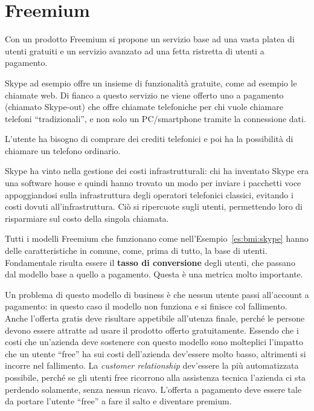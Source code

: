 \section{Freemium}

Con un prodotto Freemium si propone un servizio base ad una vasta platea di
utenti gratuiti e un servizio avanzato ad una fetta ristretta di utenti a
pagamento.

\begin{example}[Skype]\label{es:bmi:skype}
Skype ad esempio offre un insieme di funzionalità gratuite, come ad esempio le
chiamate web. Di fianco a questo servizio ne viene offerto uno a pagamento
(chiamato Skype-out) che offre chiamate telefoniche per chi vuole chiamare
telefoni ``tradizionali'', e non solo un PC/smartphone tramite la connessione
dati.

\noindent L'utente ha bisogno di comprare dei crediti telefonici e poi ha la
possibilità di chiamare un telefono ordinario.

\noindent Skype ha vinto nella gestione dei costi infrastrutturali:
chi ha inventato Skype era una software house e quindi hanno trovato un modo per inviare i pacchetti voce appoggiandosi sulla infrastruttura degli operatori telefonici classici, evitando i costi dovuti all'infrastruttura. Ciò si ripercuote sugli utenti, permettendo loro di risparmiare sul costo della singola chiamata.
\end{example}

\noindent Tutti i modelli Freemium che funzionano come
nell'Esempio~\ref{es:bmi:skype} hanno delle caratteristiche in comune, come,
prima di tutto, la base di utenti.
Fondamentale risulta essere il \textbf{tasso di conversione} degli utenti, che passano dal modello base a quello a pagamento. Questa è una metrica molto importante.

Un problema di questo modello di business è che nessun utente passi all'account
a pagamento: in questo caso il modello non funziona e si finisce col
fallimento. Anche l'offerta gratis deve risultare appetibile all'utenza finale,
perché le persone devono essere attratte ad usare il prodotto offerto
gratuitamente. Essendo che i costi che un'azienda deve sostenere con questo
modello sono molteplici l'impatto che un utente ``free'' ha sui costi
dell'azienda dev'essere molto basso, altrimenti si incorre nel fallimento.
La \textit{customer relationship} dev'essere la più automatizzata possibile,
perché se gli utenti free ricorrono alla assistenza tecnica l'azienda ci sta
perdendo solamente, senza nessun ricavo.
L'offerta a pagamento deve essere tale da portare l'utente ``free'' a fare il
salto e diventare premium.

